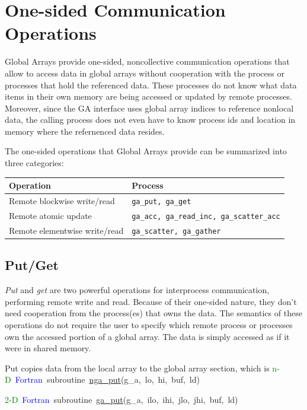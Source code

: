 \chapter{One-sided Communication Operations}

Global Arrays provide one-sided, noncollective communication operations
that allow to access data in global arrays without cooperation with
the process or processes that hold the referenced data. These processes
do not know what data items in their own memory are being accessed
or updated by remote processes. Moreover, since the GA interface uses
global array indices to reference nonlocal data, the calling process
does not even have to know process ids and location in memory where
the refernenced data resides.

The one-sided operations that Global Arrays provide can be summarized
into three categories: 

\begin{tabular}{|>{\centering}p{4cm}|>{\centering}p{4cm}|}
\hline 
Operation & Process\tabularnewline
\hline
\hline 
Remote blockwise write/read & \texttt{ga\_put, ga\_get}\tabularnewline
\hline 
Remote atomic update & \texttt{ga\_acc, ga\_read\_inc, ga\_scatter\_acc}\tabularnewline
\hline 
Remote elementwise write/read & \texttt{ga\_scatter, ga\_gather}\tabularnewline
\hline
\end{tabular}


\section{Put/Get }

\emph{Put} and \emph{get} are two powerful operations for interprocess
communication, performing remote write and read. Because of their
one-sided nature, they don't need cooperation from the process(es)
that owns the data. The semantics of these operations do not require
the user to specify which remote process or processes own the accessed
portion of a global array. The data is simply accessed as if it were
in shared memory.

Put copies data from the local array to the global array section,
which is
\textcolor{green}{n-D}~\textcolor{blue}{Fortran}~subroutine~\href{https://hpc.pnl.gov/globalarrays/api/f_op_api.html\#PUT}{nga\_{}put}(g\_a,~lo,~hi,~buf,~ld)~

\textcolor{green}{2-D}~\textcolor{blue}{Fortran}~subroutine~\href{https://hpc.pnl.gov/globalarrays/api/f_op_api.html\#PUT}{ga\_{}put}(g\_a,~ilo,~ihi,~jlo,~jhi,~buf,~ld)~


